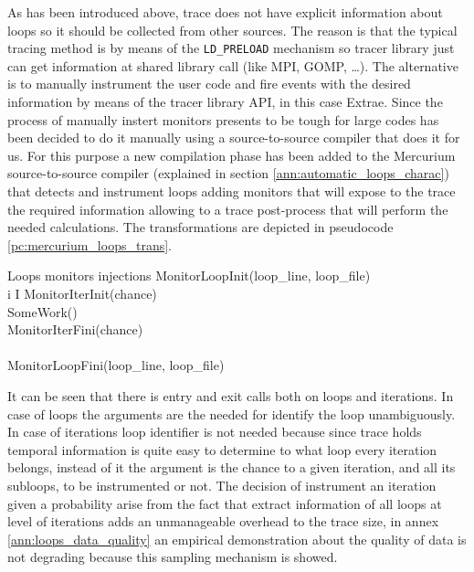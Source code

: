 As has been introduced above, trace does not have explicit information about 
loops so it should be collected from other sources. The reason is that the typical
tracing method is by means of the {\tt LD_PRELOAD} mechanism so tracer library just
can get information at shared library call (like MPI, GOMP, \dots). The alternative
is to manually instrument the user code and fire events with the desired information
by means of the tracer library API, in this case Extrae. Since the process of
manually instert monitors presents to be tough for large codes has been decided
to do it manually using a source-to-source compiler that does it for us. For this 
purpose a new compilation phase has been added to the Mercurium source-to-source 
compiler (explained in section \ref{ann:automatic_loops_charac}) that detects and instrument 
loops adding monitors that will expose to the trace the required information
allowing to a trace post-process that will perform the needed calculations. The
transformations are depicted in pseudocode \ref{pc:mercurium_loops_trans}.

\begin{pseudocode}{Loops monitors injections}{ }
\label{pc:mercurium_loops_trans}
    MonitorLoopInit(loop_{line}, loop_{file})\\
    \FOR i \in I \DO
	\BEGIN
        MonitorIterInit(chance)\\
        SomeWork()\\
        MonitorIterFini(chance)\\
	\END\\
    MonitorLoopFini(loop_{line}, loop_{file})\\
\end{pseudocode}

It can be seen that there is entry and exit calls both on
loops and iterations. In case of loops the arguments are the needed for identify
the loop unambiguously. In case of iterations loop identifier is not needed
because since trace holds temporal information is quite easy to determine to
what loop every iteration belongs, instead of it the argument is the chance to a
given iteration, and all its subloops, to be instrumented or not. The decision of
instrument an iteration given a probability arise from the fact that extract
information of all loops at level of iterations adds an unmanageable overhead to
the trace size, in annex \ref{ann:loops_data_quality} an empirical demonstration 
about the quality of data is not degrading because this sampling mechanism is 
showed.

